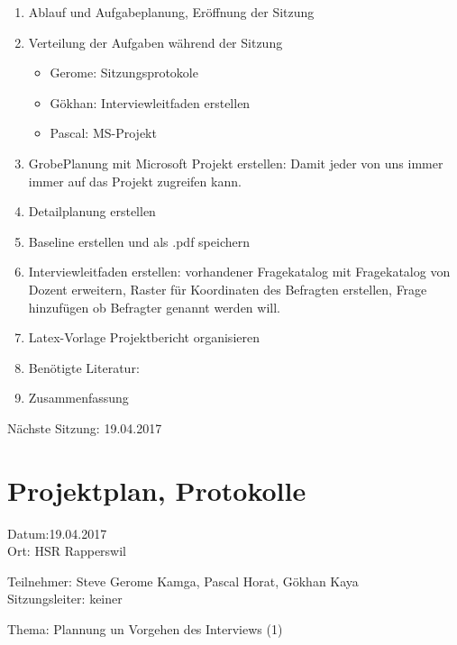 \begin{enumerate}

\item Ablauf und Aufgabeplanung, Eröffnung der Sitzung 

\item  Verteilung der Aufgaben während der Sitzung
\begin{itemize}
\item Gerome: Sitzungsprotokole
\item Gökhan: Interviewleitfaden erstellen
\item Pascal: MS-Projekt
\end{itemize}

\item GrobePlanung mit Microsoft Projekt erstellen: Damit jeder von uns immer immer auf das Projekt zugreifen kann.

\item Detailplanung erstellen

\item Baseline erstellen und als .pdf speichern

\item Interviewleitfaden erstellen: vorhandener Fragekatalog mit Fragekatalog von Dozent erweitern, Raster für Koordinaten des Befragten erstellen, Frage hinzufügen ob Befragter genannt werden will.

\item Latex-Vorlage Projektbericht organisieren

\item Benötigte Literatur: 

\item Zusammenfassung

\end{enumerate}

Nächste Sitzung: 19.04.2017

\newpage
\section*{Projektplan, Protokolle}

Datum:19.04.2017\\
Ort: HSR Rapperswil

Teilnehmer: Steve Gerome Kamga, Pascal Horat, Gökhan Kaya\\
Sitzungsleiter: keiner

Thema: Plannung un Vorgehen des Interviews (1)

